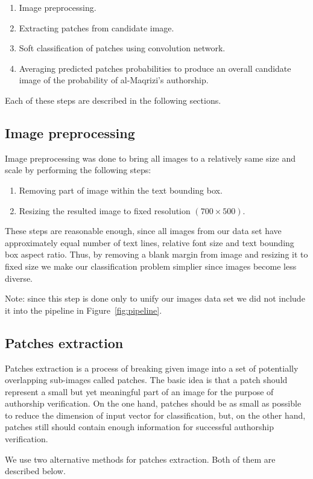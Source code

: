 \documentclass[conference]{IEEEtran}
\begin{document}
\begin{enumerate}
	\item Image preprocessing.
	\item Extracting patches from candidate image.
	\item Soft classification of patches using convolution network.
	\item Averaging predicted patches probabilities to produce an overall candidate image of the probability of al-Maqrizi's authorship.
\end{enumerate}

Each of these steps are described in the following sections.	


\subsection{Image preprocessing}
Image preprocessing was done to bring all images to a relatively same size and scale by performing the following steps:
\begin{enumerate}
	\item Removing part of image within the text bounding box.
	\item Resizing the resulted image to fixed resolution $(700\times 500)$.
\end{enumerate}
These steps are reasonable enough, since all images from our data set have approximately equal number of text lines, relative font size and text bounding box aspect ratio. Thus, by removing a blank margin from image and resizing it to fixed size we make our classification problem simplier since images become less diverse. 

Note: since this step is done only to unify our images data set we did not include it into the pipeline in Figure~\ref{fig:pipeline}.

\subsection{Patches extraction}
Patches extraction is a process of breaking given image into a set of potentially overlapping sub-images called patches. The basic idea is that a patch should represent a small but yet meaningful part of an image for the purpose of authorship verification. On the one hand, patches should be as small as possible to reduce the dimension of input vector for classification, but, on the other hand, patches still should contain enough information for successful authorship verification.  

We use two alternative methods for patches extraction. Both of them are described below.
\end{document}
